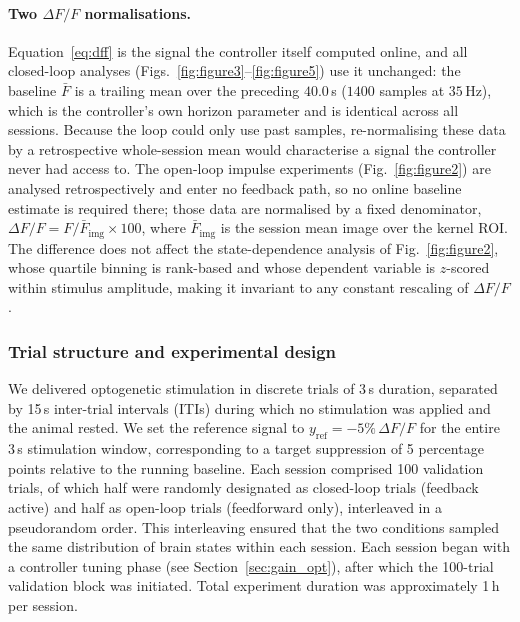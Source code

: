 \paragraph{Two $\Delta F/F$ normalisations.}
Equation~\ref{eq:dff} is the signal the controller itself computed online, and all
closed-loop analyses (Figs.~\ref{fig:figure3}--\ref{fig:figure5}) use it unchanged: the
baseline $\bar{F}$ is a trailing mean over the preceding $40.0$\,s ($1400$ samples at
$35$\,Hz), which is the controller's own horizon parameter and is identical across all
sessions. Because the loop could only use past samples, re-normalising these data by a
retrospective whole-session mean would characterise a signal the controller never had
access to. The open-loop impulse experiments (Fig.~\ref{fig:figure2}) are analysed
retrospectively and enter no feedback path, so no online baseline estimate is required
there; those data are normalised by a fixed denominator, $\Delta F/F = F/\bar{F}_{\mathrm{img}}
\times 100$, where $\bar{F}_{\mathrm{img}}$ is the session mean image over the kernel ROI.
The difference does not affect the state-dependence analysis of Fig.~\ref{fig:figure2},
whose quartile binning is rank-based and whose dependent variable is $z$-scored within
stimulus amplitude, making it invariant to any constant rescaling of $\Delta F/F$.

\subsubsection*{Trial structure and experimental design}

We delivered optogenetic stimulation in discrete trials of 3\,s
duration, separated by 15\,s inter-trial intervals (ITIs) during which
no stimulation was applied and the animal rested. We set the reference
signal to $y_{\mathrm{ref}} = -5\%\,\Delta F/F$ for the entire 3\,s
stimulation window, corresponding to a target suppression of 5
percentage points relative to the running baseline. Each session
comprised 100 validation trials, of which half were randomly designated
as closed-loop trials (feedback active) and half as open-loop trials
(feedforward only), interleaved in a pseudorandom order. This
interleaving ensured that the two conditions sampled the same
distribution of brain states within each session. Each session began
with a controller tuning phase (see Section~\ref{sec:gain_opt}), after
which the 100-trial validation block was initiated. Total experiment
duration was approximately 1\,h per session.

